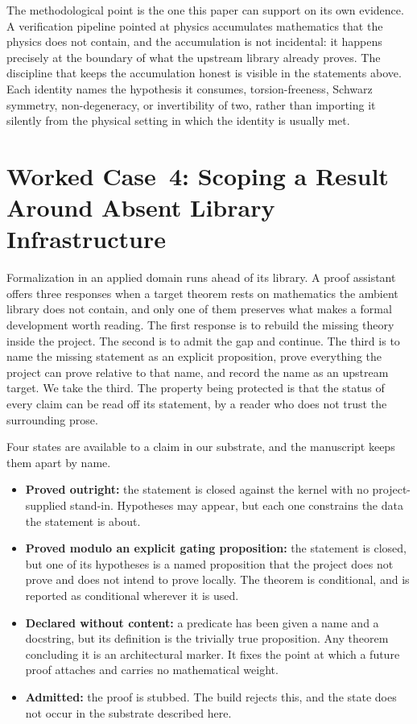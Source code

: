 \documentclass[11pt]{article}
\begin{document}
The methodological point is the one this paper can support on its own
evidence. A verification pipeline pointed at physics accumulates
mathematics that the physics does not contain, and the accumulation is
not incidental: it happens precisely at the boundary of what the upstream
library already proves. The discipline that keeps the accumulation honest
is visible in the statements above. Each identity names the hypothesis it
consumes, torsion-freeness, Schwarz symmetry, non-degeneracy, or
invertibility of two, rather than importing it silently from the physical
setting in which the identity is usually met.

\section{Worked Case~4: Scoping a Result Around Absent Library Infrastructure}
\label{sec:structural_prop_scoping}


Formalization in an applied domain runs ahead of its library. A
proof assistant offers three responses when a target theorem rests
on mathematics the ambient library does not contain, and only one
of them preserves what makes a formal development worth reading.
The first response is to rebuild the missing theory inside the
project. The second is to admit the gap and continue. The third is
to name the missing statement as an explicit proposition, prove
everything the project can prove relative to that name, and record
the name as an upstream target. We take the third. The property
being protected is that the status of every claim can be read off
its statement, by a reader who does not trust the surrounding
prose.

Four states are available to a claim in our substrate, and the
manuscript keeps them apart by name.

\begin{itemize}
  \item \textbf{Proved outright:} the statement is closed against
    the kernel with no project-supplied stand-in. Hypotheses may
    appear, but each one constrains the data the statement is about.
  \item \textbf{Proved modulo an explicit gating proposition:} the
    statement is closed, but one of its hypotheses is a named
    proposition that the project does not prove and does not intend
    to prove locally. The theorem is conditional, and is reported as
    conditional wherever it is used.
  \item \textbf{Declared without content:} a predicate has been given
    a name and a docstring, but its definition is the trivially true
    proposition. Any theorem concluding it is an architectural
    marker. It fixes the point at which a future proof attaches and
    carries no mathematical weight.
  \item \textbf{Admitted:} the proof is stubbed. The build rejects
    this, and the state does not occur in the substrate described
    here.
\end{itemize}
\end{document}
